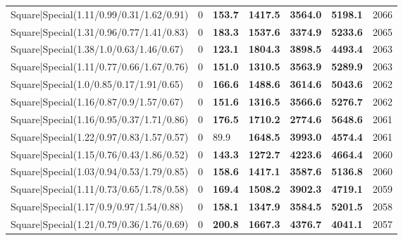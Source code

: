 \begin{tabular}{lrllllr}
 Square|Special(1.11/0.99/0.31/1.62/0.91)                      &             0   & \textbf{153.7} & \textbf{1417.5} & \textbf{3564.0} & \textbf{5198.1} &         2066 \\
 Square|Special(1.31/0.96/0.77/1.41/0.83)                      &             0   & \textbf{183.3} & \textbf{1537.6} & \textbf{3374.9} & \textbf{5233.6} &         2065 \\
 Square|Special(1.38/1.0/0.63/1.46/0.67)                       &             0   & \textbf{123.1} & \textbf{1804.3} & \textbf{3898.5} & \textbf{4493.4} &         2063 \\
 Square|Special(1.11/0.77/0.66/1.67/0.76)                      &             0   & \textbf{151.0} & \textbf{1310.5} & \textbf{3563.9} & \textbf{5289.9} &         2063 \\
 Square|Special(1.0/0.85/0.17/1.91/0.65)                       &             0   & \textbf{166.6} & \textbf{1488.6} & \textbf{3614.6} & \textbf{5043.6} &         2062 \\
 Square|Special(1.16/0.87/0.9/1.57/0.67)                       &             0   & \textbf{151.6} & \textbf{1316.5} & \textbf{3566.6} & \textbf{5276.7} &         2062 \\
 Square|Special(1.16/0.95/0.37/1.71/0.86)                      &             0   & \textbf{176.5} & \textbf{1710.2} & \textbf{2774.6} & \textbf{5648.6} &         2061 \\
 Square|Special(1.22/0.97/0.83/1.57/0.57)                      &             0   & 89.9           & \textbf{1648.5} & \textbf{3993.0} & \textbf{4574.4} &         2061 \\
 Square|Special(1.15/0.76/0.43/1.86/0.52)                      &             0   & \textbf{143.3} & \textbf{1272.7} & \textbf{4223.6} & \textbf{4664.4} &         2060 \\
 Square|Special(1.03/0.94/0.53/1.79/0.85)                      &             0   & \textbf{158.6} & \textbf{1417.1} & \textbf{3587.6} & \textbf{5136.8} &         2060 \\
 Square|Special(1.11/0.73/0.65/1.78/0.58)                      &             0   & \textbf{169.4} & \textbf{1508.2} & \textbf{3902.3} & \textbf{4719.1} &         2059 \\
 Square|Special(1.17/0.9/0.97/1.54/0.88)                       &             0   & \textbf{158.1} & \textbf{1347.9} & \textbf{3584.5} & \textbf{5201.5} &         2058 \\
 Square|Special(1.21/0.79/0.36/1.76/0.69)                      &             0   & \textbf{200.8} & \textbf{1667.3} & \textbf{4376.7} & \textbf{4041.1} &         2057 \\

\end{tabular}
